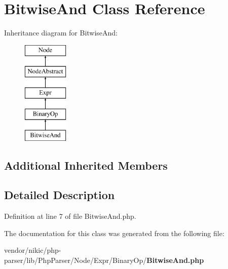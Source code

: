 \section{Bitwise\+And Class Reference}
\label{class_php_parser_1_1_node_1_1_expr_1_1_binary_op_1_1_bitwise_and}
Inheritance diagram for Bitwise\+And\+:\begin{figure}[H]
\begin{center}
\leavevmode
\includegraphics[height=5.000000cm]{class_php_parser_1_1_node_1_1_expr_1_1_binary_op_1_1_bitwise_and}
\end{center}
\end{figure}
\subsection*{Additional Inherited Members}


\subsection{Detailed Description}


Definition at line 7 of file Bitwise\+And.\+php.



The documentation for this class was generated from the following file\+:\begin{DoxyCompactItemize}
\item 
vendor/nikic/php-\/parser/lib/\+Php\+Parser/\+Node/\+Expr/\+Binary\+Op/{\bf Bitwise\+And.\+php}\end{DoxyCompactItemize}
